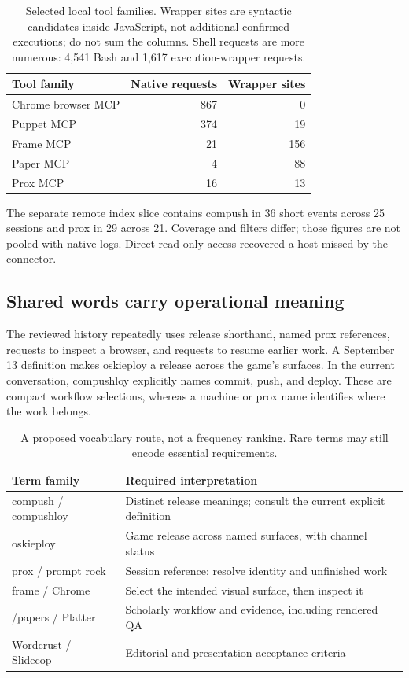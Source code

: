 \documentclass[10pt,letterpaper,twocolumn]{article}
\begin{document}
\begin{table}[ht]
\centering\small
\begin{tabularx}{\columnwidth}{@{}Xrr@{}}
\toprule
Tool family & Native requests & Wrapper sites\\
\midrule
Chrome browser MCP & 867 & 0\\
Puppet MCP & 374 & 19\\
Frame MCP & 21 & 156\\
Paper MCP & 4 & 88\\
Prox MCP & 16 & 13\\
\bottomrule
\end{tabularx}
\caption{Selected local tool families. Wrapper sites are syntactic candidates inside JavaScript, not additional confirmed executions; do not sum the columns. Shell requests are more numerous: 4,541 Bash and 1,617 execution-wrapper requests.}
\end{table}

The separate remote index slice contains compush in 36 short events across 25 sessions and prox in 29 across 21. Coverage and filters differ; those figures are not pooled with native logs. Direct read-only access recovered a host missed by the connector.

\subsection{Shared words carry operational meaning}
The reviewed history repeatedly uses release shorthand, named prox references, requests to inspect a browser, and requests to resume earlier work. A September 13 definition makes oskieploy a release across the game's surfaces. In the current conversation, compushloy explicitly names commit, push, and deploy. These are compact workflow selections, whereas a machine or prox name identifies where the work belongs.

\begin{table}[ht]
\centering\small
\begin{tabularx}{\columnwidth}{@{}lX@{}}
\toprule
Term family & Required interpretation\\
\midrule
compush / compushloy & Distinct release meanings; consult the current explicit definition\\
oskieploy & Game release across named surfaces, with channel status\\
prox / prompt rock & Session reference; resolve identity and unfinished work\\
frame / Chrome & Select the intended visual surface, then inspect it\\
/papers / Platter & Scholarly workflow and evidence, including rendered QA\\
Wordcrust / Slidecop & Editorial and presentation acceptance criteria\\
\bottomrule
\end{tabularx}
\caption{A proposed vocabulary route, not a frequency ranking. Rare terms may still encode essential requirements.}
\end{table}
\end{document}
